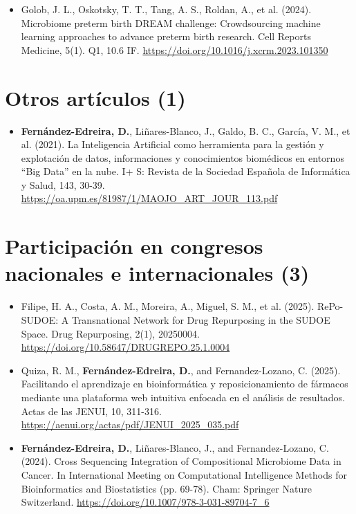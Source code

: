 \begin{itemize}

    \item Golob, J. L., Oskotsky, T. T., Tang, A. S., Roldan, A., et al. (2024). Microbiome preterm birth DREAM challenge: Crowdsourcing machine learning approaches to advance preterm birth research. Cell Reports Medicine, 5(1). Q1, 10.6 IF. \url{https://doi.org/10.1016/j.xcrm.2023.101350}

\end{itemize}

\section{Otros artículos (1)}

\begin{itemize}

    \item \textbf{Fernández-Edreira, D.}, Liñares-Blanco, J., Galdo, B. C., García, V. M., et al. (2021). La Inteligencia Artificial como herramienta para la gestión y explotación de datos, informaciones y conocimientos biomédicos en entornos “Big Data” en la nube. I+ S: Revista de la Sociedad Española de Informática y Salud, 143, 30-39. \url{https://oa.upm.es/81987/1/MAOJO_ART_JOUR_113.pdf}

\end{itemize}

\section{Participación en congresos nacionales e internacionales (3)}

\begin{itemize}

    \item Filipe, H. A., Costa, A. M., Moreira, A., Miguel, S. M., et al. (2025). RePo-SUDOE: A Transnational Network for Drug Repurposing in the SUDOE Space. Drug Repurposing, 2(1), 20250004. \url{https://doi.org/10.58647/DRUGREPO.25.1.0004}

    \item Quiza, R. M., \textbf{Fernández-Edreira, D.}, and Fernandez-Lozano, C. (2025). Facilitando el aprendizaje en bioinformática y reposicionamiento de fármacos mediante una plataforma web intuitiva enfocada en el análisis de resultados. Actas de las JENUI, 10, 311-316. \url{https://aenui.org/actas/pdf/JENUI_2025_035.pdf}

    \item \textbf{Fernández-Edreira, D.}, Liñares-Blanco, J., and Fernandez-Lozano, C. (2024). Cross Sequencing Integration of Compositional Microbiome Data in Cancer. In International Meeting on Computational Intelligence Methods for Bioinformatics and Biostatistics (pp. 69-78). Cham: Springer Nature Switzerland. \url{https://doi.org/10.1007/978-3-031-89704-7_6}

\end{itemize}




